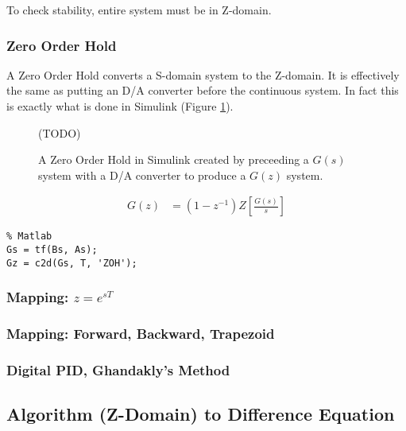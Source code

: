 \documentclass{article}
\newcommand{\sincludepdf}[2][]{
	
}
\begin{document}
To check stability, entire system must be in Z-domain.


\subsubsection{Zero Order Hold}

A Zero Order Hold converts a S-domain system to the Z-domain.
It is effectively the same as putting an D/A converter before
the continuous system.
In fact this is exactly what is done in Simulink (Figure \ref{fig:simulinkzoh}).

\begin{figure}
(TODO)
\caption{A Zero Order Hold in Simulink created by preceeding
a $G(s)$ system with a D/A converter to produce a $G(z)$ system.}
\label{fig:simulinkzoh}
\end{figure}

\begin{align}
	G(z) &= (1 - z^{-1}) Z \left[ \frac{G(s)}{s} \right]
\end{align}

\begin{lstlisting}
% Matlab
Gs = tf(Bs, As);
Gz = c2d(Gs, T, 'ZOH');
\end{lstlisting}

\sincludepdf[pages={8}]{scan/11211301.pdf}

\subsubsection{Mapping: $z=e^{sT}$}

\subsubsection{Mapping: Forward, Backward, Trapezoid}

\sincludepdf[pages={9}]{scan/11211301.pdf}

\sincludepdf[pages={10}]{scan/11211301.pdf}

\subsubsection{Digital PID, Ghandakly's Method}

\subsection{Algorithm (Z-Domain) to Difference Equation}
\end{document}
